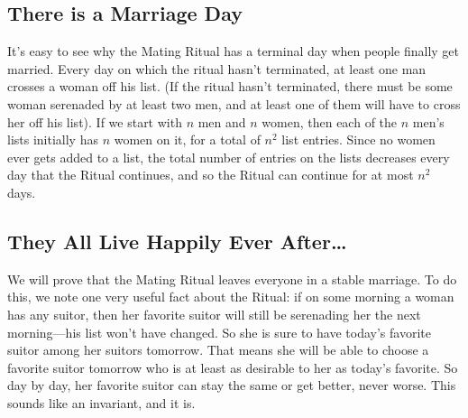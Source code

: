 
\subsection{There is a Marriage Day}

It's easy to see why the Mating Ritual has a terminal day when people
finally get married.  Every day on which the ritual hasn't terminated, at
least one man crosses a woman off his list.  (If the ritual hasn't
terminated, there must be some woman serenaded by at least two men, and at
least one of them will have to cross her off his list).  If we start with
$n$ men and $n$ women, then each of the $n$ men's lists initially has $n$
women on it, for a total of $n^2$ list entries.  Since no women ever gets
added to a list, the total number of entries on the lists decreases every
day that the Ritual continues, and so the Ritual can continue for at most
$n^2$ days.

\subsection{They All Live Happily Ever After\dots}

We will prove that the Mating Ritual leaves everyone in a stable
marriage.  To do this, we note one very useful fact about the Ritual:
if on some morning a woman has any suitor, then her favorite suitor
will still be serenading her the next morning---his list won't have
changed.  So she is sure to have today's favorite suitor among her
suitors tomorrow.  That means she will be able to choose a favorite
suitor tomorrow who is at least as desirable to her as today's
favorite.  So day by day, her favorite suitor can stay the same or get
better, never worse.  This sounds like an invariant, and it is.

